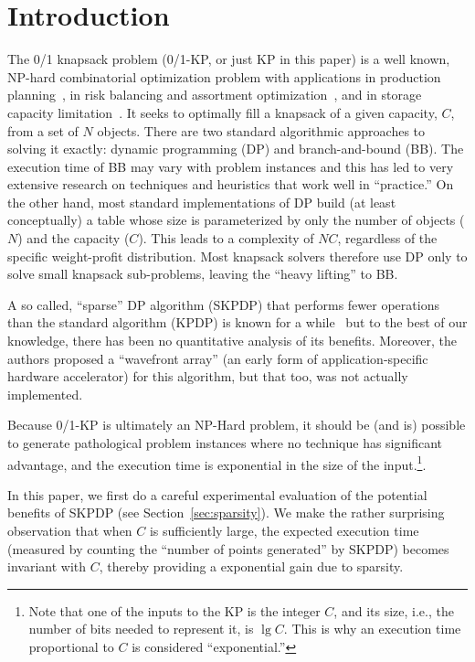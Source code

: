 \chapter{Introduction}
\label{chap:intro}
The 0/1 knapsack problem (0/1-KP, or just KP in this paper) is a well known,
NP-hard combinatorial optimization problem with applications in production
planning~\cite{Camargo-etal-COR-2012}, in risk balancing and assortment
optimization~\cite{Rooderkerk-vanHeerde-EJOR-2016}, and in storage capacity
limitation~\cite{Jolai-etal-AppMathComp-2007}.  It seeks to optimally fill a
knapsack of a given capacity, $C$, from a set of $N$ objects.  There are two
standard algorithmic approaches to solving it exactly: dynamic programming
(DP) and branch-and-bound (BB).  The execution time of BB may vary with
problem instances and this has led to very extensive research on techniques
and heuristics that work well in ``practice.''  On the other hand, most
standard implementations of DP build (at least conceptually) a table whose
size is parameterized by only the number of objects ($N$) and the capacity
($C$).  This leads to a complexity of $NC$, regardless of the specific
weight-profit distribution.  Most knapsack solvers therefore use DP only to
solve small knapsack sub-problems, leaving the ``heavy lifting'' to BB.
  
A so called, ``sparse'' DP algorithm (SKPDP) that performs fewer operations
than the standard algorithm (KPDP) is known for a while~\cite{sanjay-asap94,
  sanjay-irreg96} but to the best of our knowledge, there has been no
quantitative analysis of its benefits.  Moreover, the authors proposed a
``wavefront array'' (an early form of application-specific hardware
accelerator) for this algorithm, but that too, was not actually implemented.

Because 0/1-KP is ultimately an NP-Hard problem, it should be (and is)
possible to generate pathological problem instances where no technique has
significant advantage, and the execution time is exponential in the size of
the input.\footnote{Note that one of the inputs to the KP is the integer $C$,
  and its size, i.e., the number of bits needed to represent it, is $\lg C$.
  This is why an execution time proportional to $C$ is considered
  ``exponential.''}.

In this paper, we first do a careful experimental evaluation of the potential
benefits of SKPDP (see Section~\ref{sec:sparsity}).  We make the rather
surprising observation that when $C$ is sufficiently large, the expected
execution time (measured by counting the ``number of points generated'' by
SKPDP) becomes invariant with $C$, thereby providing a exponential gain due to
sparsity.

